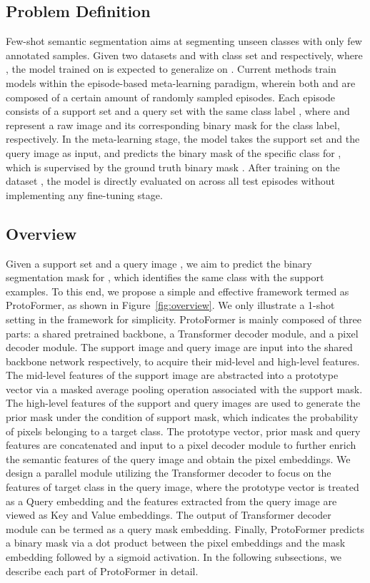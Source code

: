\documentclass[journal]{IEEEtran}
\begin{document}
\subsection{Problem Definition}
Few-shot semantic segmentation aims at segmenting unseen classes with only few annotated samples. Given two datasets  and  with class set  and  respectively, where , the model trained on  is expected to generalize on . Current methods train models within the episode-based meta-learning paradigm, wherein both  and  are composed of a certain amount of randomly sampled episodes. Each episode consists of a support set  and a query set  with the same class label , where  and  represent a raw image and its corresponding binary mask for the class label, respectively. In the meta-learning stage, the model takes the support set  and the query image  as input, and predicts the binary mask of the specific class for , which is supervised by the ground truth binary mask . After training on the dataset , the model is directly evaluated on  across all test episodes without implementing any fine-tuning stage.

\subsection{Overview}
Given a support set  and a query image , we aim to predict the binary segmentation mask for , which identifies the same class with the support examples. To this end, we propose a simple and effective framework termed as ProtoFormer, as shown in Figure~\ref{fig:overview}. We only illustrate a 1-shot setting in the framework for simplicity. ProtoFormer is mainly composed of three parts: a shared pretrained backbone, a Transformer decoder module, and a pixel decoder module. The support image  and query image  are input into the shared backbone network respectively, to acquire their mid-level and high-level features. The mid-level features of the support image are abstracted into a prototype vector via a masked average pooling operation associated with the support mask. The high-level features of the support and query images are used to generate the prior mask under the condition of support mask, which indicates the probability of pixels belonging to a target class. The prototype vector, prior mask and query features are concatenated and input to a pixel decoder module to further enrich the semantic features of the query image and obtain the pixel embeddings. We design a parallel module utilizing the Transformer decoder to focus on the features of target class in the query image, where the prototype vector is treated as a Query embedding and the features extracted from the query image are viewed as Key and Value embeddings. The output of Transformer decoder module can be termed as a query mask embedding. Finally, ProtoFormer predicts a binary mask via a dot product between the pixel embeddings and the mask embedding followed by a sigmoid activation. In the following subsections, we describe each part of ProtoFormer in detail.
\end{document}
